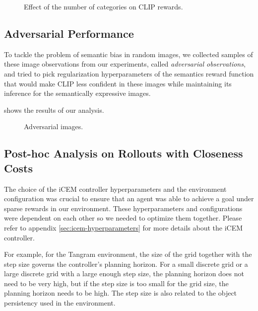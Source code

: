 \begin{figure}[h]
    \centering
    \caption{Effect of the number of categories on CLIP rewards.}
    \label{fig:clip-categories}
\end{figure}

\subsection{Adversarial Performance}
\label{sec:adversarial-performance}
To tackle the problem of semantic bias in random images, we collected samples of these image observations from our experiments, called \emph{adversarial observations}, and tried to pick regularization hyperparameters of the semantics reward function that would make CLIP less confident in these images while maintaining its inference for the semantically expressive images.

 shows the results of our analysis.
\begin{figure}[h]
    \centering
    \caption{Adversarial images.}
    \label{fig:adversarial-images}
\end{figure}



\subsection{Post-hoc Analysis on Rollouts with Closeness Costs}
\label{sec:closeness-rollouts}
The choice of the iCEM controller hyperparameters and the environment configuration was crucial to ensure that an agent was able to achieve a goal under sparse rewards in our environment.
These hyperparameters and configurations were dependent on each other so we needed to optimize them together.
Please refer to appendix \ref{sec:icem-hyperparameters} for more details about the iCEM controller.

For example, for the Tangram environment, the size of the grid together with the step size governs the controller's planning horizon.
For a small discrete grid or a large discrete grid with a large enough step size, the planning horizon does not need to be very high, but if the step size is too small for the grid size, the planning horizon needs to be high.
The step size is also related to the object persistency used in the environment.

